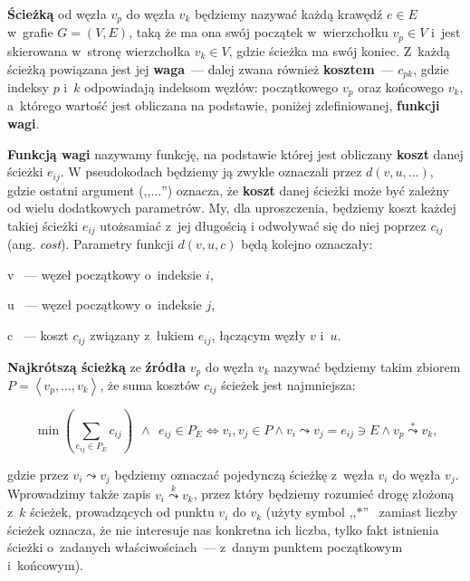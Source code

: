 \begin{myitemize}

\item \textbf{Ścieżką} od węzła $v_{p}$ do węzła $v_{k}$ będziemy nazywać każdą krawędź $e \in E$ w~grafie $G = \left( V, E \right)$, taką że ma ona swój początek w~wierzchołku $v_{p} \in V$ i~jest skierowana w~stronę wierzchołka $v_{k} \in V$, gdzie ścieżka ma swój koniec. Z~każdą ścieżką powiązana jest jej \textbf{waga}~---  dalej zwana również \textbf{kosztem}~---  $c_{pk}$, gdzie indeksy $p$ i~$k$ odpowiadają indeksom węzłów: początkowego $v_{p}$ oraz końcowego $v_{k}$, a~którego wartość jest obliczana na podstawie, poniżej zdefiniowanej, \textbf{funkcji wagi}.

\item \textbf{Funkcją wagi} nazywamy funkcję, na podstawie której jest obliczany \textbf{koszt} danej ścieżki $e_{ij}$. W pseudokodach będziemy ją zwykle oznaczali przez $ d \left( v, u, \ldots \right) $, gdzie ostatni argument (,,$\ldots$'') oznacza, że \textbf{koszt} danej ścieżki może być zależny od wielu dodatkowych parametrów. My, dla uproszczenia, będziemy koszt każdej takiej ścieżki $e_{ij}$ utożsamiać z~jej długością i odwoływać się do niej poprzez $c_{ij}$ (ang. \textit{cost}). Parametry funkcji $ d \left( v, u, c \right) $ będą kolejno oznaczały:

\begin{myitemize}

\item[v]~---  węzeł początkowy o~indeksie $i$,
\item[u]~---  węzeł początkowy o~indeksie $j$,
\item[c]~---  koszt $c_{ij}$ związany z~łukiem $e_{ij}$, łączącym węzły $v$ i~$u$.

\end{myitemize}


\item \textbf{Najkrótszą ścieżką} ze \textbf{źródła} $v_{p}$ do węzła $v_{k}$ nazywać będziemy takim zbiorem $P = \left \langle v_{p}, \ldots, v_{k} \right \rangle $, że suma kosztów $c_{ij}$ ścieżek jest najmniejsza:

\begin{equation}
\min \left( \sum_{e_{ij} \in P_{E}} c_{ij} \right) \: \: \wedge \: \: e_{ij} \in P_{E} \Leftrightarrow v_{i},v_{j} \in P \wedge v_{i} \leadsto v_{j} = e_{ij} \ni E \wedge v_{p} \overset{*}\leadsto v_{k}\textrm{,}
\end{equation}

gdzie przez $v_{i} \leadsto v_{j}$ będziemy oznaczać pojedynczą ścieżkę z~węzła $v_{i}$ do węzła $v_{j}$. Wprowadzimy także zapis $v_{i} \overset{k}\leadsto v_{k}$, przez który będziemy rozumieć drogę złożoną z~$k$ ścieżek, prowadzących od punktu $v_{i}$ do $v_{k}$ (użyty symbol ,,$*$''~ zamiast liczby ścieżek oznacza, że nie interesuje nas konkretna ich liczba, tylko fakt istnienia ścieżki o~zadanych właściwościach~---  z~danym punktem początkowym i~końcowym). 


\end{myitemize}
